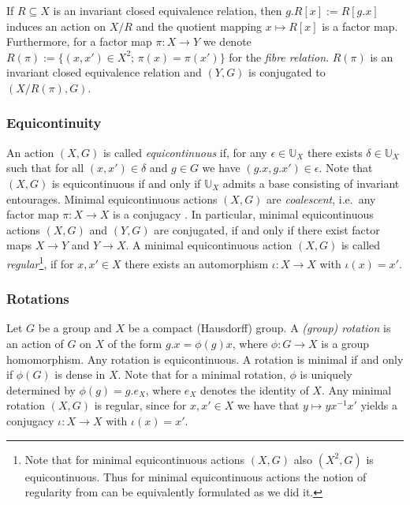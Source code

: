 \documentclass[12pt, reqno]{amsart}
\theoremstyle{definition}
\theoremstyle{remark}
\numberwithin{equation}{section}
\theoremstyle{theorem}
\theoremstyle{remark}
\begin{document}
If $R\subseteq X$ is an invariant closed equivalence relation, then $g.R[x]:=R[g.x]$ induces an action on $X/R$ and the quotient mapping $x\mapsto R[x]$ is a factor map.  
Furthermore, for a factor map $\pi\colon X\to Y$ we denote $R(\pi):=\{(x,x')\in X^2;\, \pi(x)=\pi(x')\}$ for the \emph{fibre relation}. 
$R(\pi)$ is an invariant closed equivalence relation and $(Y,G)$ is conjugated to $(X/R(\pi),G)$. 

\subsubsection{Equicontinuity}
\label{subsubsec:prelims_actions_Equicontinuity}
An action $(X,G)$ is called \emph{equicontinuous} if, for any $\epsilon\in \mathbb{U}_X$ there exists $\delta\in \mathbb{U}_X$ such that for all $(x,x')\in \delta$ and $g\in G$ we have $(g.x,g.x')\in \epsilon$. 
Note that $(X,G)$ is equicontinuous if and only if $\mathbb{U}_X$ admits a base consisting of invariant entourages. 
Minimal equicontinuous actions $(X,G)$ are \emph{coalescent}, i.e.\ any factor map $\pi\colon X\to X$ is a conjugacy \cite[Page~81]{auslander1988minimal}. In particular, minimal equicontinuous actions $(X,G)$ and $(Y,G)$ are conjugated, if and only if there exist factor maps $X\to Y$ and $Y\to X$. 
A minimal equicontinuous action $(X,G)$ is called \emph{regular}\footnote{
    Note that for minimal equicontinuous actions $(X,G)$ also $(X^2,G)$ is equicontinuous. 
    Thus for minimal equicontinuous actions the notion of regularity from \cite[Page~147]{auslander1988minimal} can be equivalently formulated as we did it.}, 
if for $x,x'\in X$ there exists an automorphism $\iota\colon X\to X$ with $\iota(x)=x'$.



\subsubsection{Rotations}
\label{subsubsec:prelims_actions_Rotations}
Let $G$ be a group and $X$ be a compact (Hausdorff) group.  
A \emph{(group) rotation} is an action of $G$ on $X$ of the form
$g.x = \phi(g) x$,
where $\phi \colon G \to X$ is a group homomorphism. 
Any rotation is equicontinuous. 
A rotation is minimal if and only if $\phi(G)$ is dense in $X$.
Note that for a minimal rotation, $\phi$ is uniquely determined by $\phi(g)=g.e_X$, where $e_X$ denotes the identity of $X$. 
Any minimal rotation $(X,G)$ is regular, since for $x,x'\in X$ we have that $y\mapsto yx^{-1}x'$ yields a conjugacy $\iota\colon X\to X$ with $\iota(x)= x'$.
\end{document}
